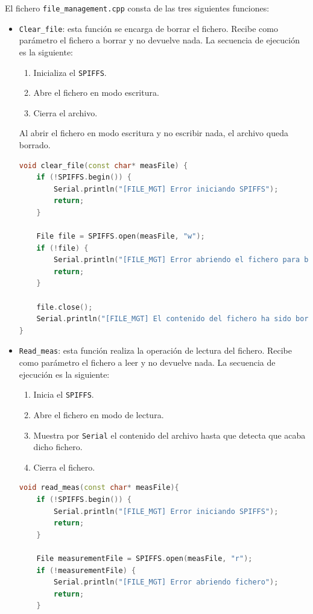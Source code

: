 El fichero \texttt{file\_management.cpp} consta de las tres siguientes funciones:
\begin{itemize}
    \item \texttt{Clear\_file}: esta función se encarga de borrar el fichero. Recibe como parámetro el fichero a borrar y no devuelve nada. La secuencia de ejecución es la siguiente:
    \begin{enumerate}
        \item Inicializa el \texttt{SPIFFS}.
        \item Abre el fichero en modo escritura.
        \item Cierra el archivo.
    \end{enumerate}
    Al abrir el fichero en modo escritura y no escribir nada, el archivo queda borrado.
    \begin{lstlisting}[captionpos=b, caption={Funcion \texttt{Clear\_file}}, language=c++]
void clear_file(const char* measFile) {
    if (!SPIFFS.begin()) {
        Serial.println("[FILE_MGT] Error iniciando SPIFFS");
        return;
    }

    File file = SPIFFS.open(measFile, "w");
    if (!file) {
        Serial.println("[FILE_MGT] Error abriendo el fichero para borrar");
        return;
    }

    file.close();
    Serial.println("[FILE_MGT] El contenido del fichero ha sido borrado.");
}
    \end{lstlisting}
    \item \texttt{Read\_meas}: esta función realiza la operación de lectura del fichero. Recibe como parámetro el fichero a leer y no devuelve nada. La secuencia de ejecución es la siguiente:
    \begin{enumerate}
        \item Inicia el \texttt{SPIFFS}.
        \item Abre el fichero en modo de lectura.
        \item Muestra por \texttt{Serial} el contenido del archivo hasta que detecta que acaba dicho fichero.
        \item Cierra el fichero.
    \end{enumerate}
    \begin{lstlisting}[captionpos=b, caption={Funcion \texttt{Read\_file}}, language=c++]
void read_meas(const char* measFile){
    if (!SPIFFS.begin()) {
        Serial.println("[FILE_MGT] Error iniciando SPIFFS");
        return;
    }

    File measurementFile = SPIFFS.open(measFile, "r");
    if (!measurementFile) {
        Serial.println("[FILE_MGT] Error abriendo fichero");
        return;
    }


\end{lstlisting}
\end{itemize}
